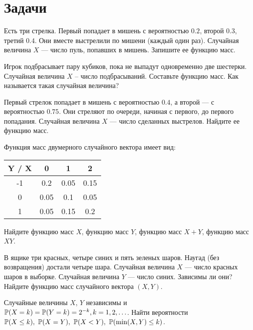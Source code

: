 \section*{Задачи}
\begin{problem}
    Есть три стрелка.
    Первый попадает в мишень с вероятностью $0.2$, второй $0.3$, третий $0.4$.
    Они вместе выстрелили по мишени (каждый один раз).
    Случайная величина $X$ — число пуль, попавших в мишень.
    Запишите ее функцию масс.
\end{problem}

\begin{problem}
    Игрок подбрасывает пару кубиков, пока не выпадут одновременно две шестерки.
    Случайная величина $X$ -- число подбрасываний.
    Составьте функцию масс.
    Как называется такая случайная величина?
\end{problem}

\begin{problem}
    Первый стрелок попадает в мишень с вероятностью $0.4$, а второй — с вероятностью $0.75$.
    Они стреляют по очереди, начиная с первого, до первого попадания.
    Случайная величина $X$ — число сделанных выстрелов.
    Найдите ее функцию масс.
\end{problem}

\begin{problem}
    Функция масс двумерного случайного вектора имеет вид:
    \begin{center}
    \begin{tabular}{c|c|c|c}
        Y / X & 0 & 1 & 2 \\
        \hline
        -1 & 0.2 & 0.05 & 0.15 \\
        \hline
        0 & 0.05 & 0.1 & 0.05 \\
        \hline
        1 & 0.05 & 0.15 & 0.2 \\
    \end{tabular}
    \end{center}
    Найдите функцию масс $X$, функцию масс $Y$, функцию масс $X + Y$, функцию масс $XY$.
\end{problem}

\begin{problem}
    В ящике три красных, четыре синих и пять зеленых шаров.
    Наугад (без возвращения) достали четыре шара.
    Случайная величина $X$ — число красных шаров в выборке.
    Случайная величина $Y$ — число синих.
    Зависимы ли они?
    Найдите функцию масс случайного вектора $(X, Y)$.
\end{problem}

\begin{problem}
    Случайные величины $X$, $Y$ независимы и $\operatorname{\mathbb{P}}(X = k) = \operatorname{\mathbb{P}}(Y = k) = 2^{-k}, k = 1, 2, \ldots$.
    Найти вероятности $\PP(X \leq k),\ \PP(X = Y),\ \PP(X < Y),\ \PP(\min(X, Y) \leq k)$.
\end{problem}
